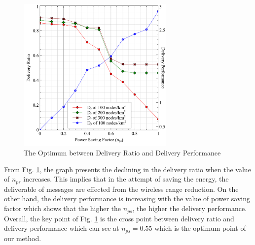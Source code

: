 \begin{figure}[!t]
\centering
\includegraphics[width=3in]{Graphs/NpsDeliveryPerformanceAndDeliveryRatio.pdf}
\caption{The Optimum between Delivery Ratio and Delivery Performance}
\label{The Optimum between Delivery Ratio and Delivery Performance}
\end{figure}

From Fig. \ref{The Optimum between Delivery Ratio and Delivery Performance}, the graph presents the declining in the delivery ratio when the value of $n_{ps}$ increases.
This implies that in the attempt of saving the energy, the deliverable of messages are effected from the wireless range reduction.
On the other hand, the delivery performance is increasing with the value of power saving factor which shows that the higher the $n_{ps}$, the higher the delivery performance.
Overall, the key point of Fig. \ref{The Optimum between Delivery Ratio and Delivery Performance} is the cross point between delivery ratio and delivery performance which can see at $n_{ps} = 0.55$ which is the optimum point of our method.

